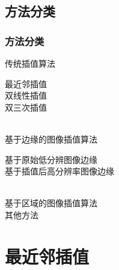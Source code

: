 \documentclass[notheorems,serif,table,compress]{beamer}  %
\begin{document}
\subsection{方法分类}

\begin{frame}
\frametitle{方法分类}
	\begin{cases}
	$传统插值算法$	
		\begin{cases}
		$最近邻插值$\\
		$双线性插值$\\
		$双三次插值$
		\end{cases}\\
	$基于边缘的图像插值算法$
		\begin{cases}
		$基于原始低分辨图像边缘$\\
		$基于插值后高分辨率图像边缘$
		\end{cases}\\
	$基于区域的图像插值算法$\\
	$其他方法$
	\end{cases}
\end{frame}


\section{最近邻插值}
\end{document}
